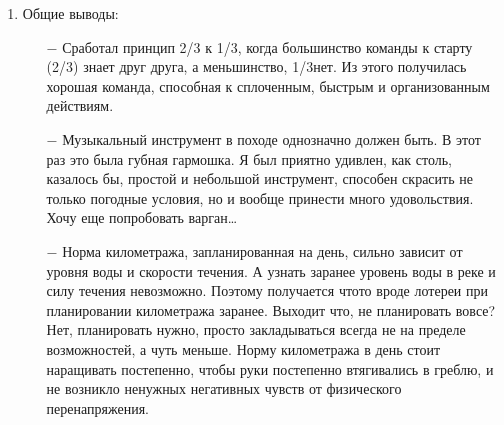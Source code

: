 \begin{enumerate}
\begin{enumerate}
		\item[$-$] Газовая плитка. Неоднозначная вещь, взятая с собой Димой. Один раз на ней мы приготовили плов и несколько раз вскипятили воды на чай. Имеет право на жизнь, места и веса много не занимает. Но тащить их несколько на 6 человек бессмысленно при таком мероприятии, как наше. Вероятнее всего, будет правильно сказать, что это такой своеобразный запасной вариант.
		\item[$-$] Панама оправдала себя лучше, чем кепки. Нос и уши не обгорают на ярком солнце, будучи прикрыты полями панамы. Харизматичная фетровая шляпа С.Ю. была вне конкуренции.
		\item[$-$] Сплавляться при чувствительной и ещё незагорелой коже лучше в х/б с длинным рукавом. У меня на такой случай есть то-о-оненький камуфляжный костюм, но пойдет и обычная х/б рубашка. Стало жарко\mdash закатал рукава. Чувствуешь, что поджаривает солнышко\mdash раскатал и намочил водой. 
		\item[$-$] Более плотная курточка с капюшоном а\sdash ля штормовка\mdash однозначно должна быть. Только, не синтетическая. Вообще, судьба синтетических тканей в походе печальна. Обычно они заканчивают в костре. Исключение составляет разве что флис.
		\item[$-$] Сапоги. В этот раз в них был Ваня и это простительно\mdash они ехали у него на байдарке и никому не мешали. Остальные были либо в шлепанцах, либо босиком, либо в химзащите, как мы с Саней. Моё предпочтение при прохладной воде, непогоде и просто нежелании мочить ноги\mdash за химзащитой по причине легкости, компактности и дешевизны.
	\end{enumerate}
\item Общие выводы:
	\begin{enumerate}
		\item[$-$] Сработал принцип 2/3 к 1/3, когда большинство команды к старту (2/3) знает друг друга, а меньшинство, 1/3\mdash нет. Из этого получилась хорошая команда, способная к сплоченным, быстрым и организованным действиям.
		\item[$-$] Музыкальный инструмент в походе однозначно должен быть. В этот раз это была губная гармошка. Я был приятно удивлен, как столь, казалось бы, простой и небольшой инструмент, способен скрасить не только погодные условия, но и вообще принести много удовольствия. Хочу еще попробовать варган…
		\item[$-$] Норма километража, запланированная на день, сильно зависит от уровня воды и скорости течения. А узнать заранее уровень воды в реке и силу течения невозможно. Поэтому получается что\sdash то вроде лотереи при планировании километража заранее. Выходит что, не планировать вовсе? Нет, планировать нужно, просто закладываться всегда не на пределе возможностей, а чуть меньше. Норму километража в день стоит наращивать постепенно, чтобы руки постепенно втягивались в греблю, и не возникло ненужных негативных чувств от физического перенапряжения.

\end{enumerate}
\end{enumerate}
